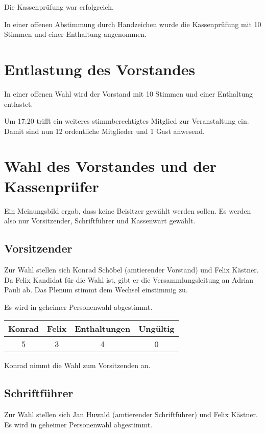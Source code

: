 \documentclass{scrartcl}
\begin{document}
Die Kassenprüfung war erfolgreich.

In einer offenen Abstimmung durch Handzeichen wurde die Kassenprüfung
mit 10 Stimmen und einer Enthaltung angenommen.

\section{Entlastung des Vorstandes}
In einer offenen Wahl wird der Vorstand mit 10 Stimmen und einer
Enthaltung entlastet.

Um 17:20 trifft ein weiteres stimmberechtigtes Mitglied zur
Veranstaltung ein. Damit sind nun 12 ordentliche Mitglieder und 1 Gast
anwesend.

\section{Wahl des Vorstandes und der Kassenprüfer}

Ein Meinungsbild ergab, dass keine Beisitzer gewählt werden sollen. Es
werden also nur Vorsitzender, Schriftführer und Kassenwart gewählt.

\subsection{Vorsitzender}
Zur Wahl stellen sich Konrad Schöbel (amtierender Vorstand) und Felix
Kästner. Da Felix Kandidat für die Wahl ist, gibt er die
Versammlungsleitung an Adrian Pauli ab. Das Plenum stimmt dem Wechsel
einstimmig zu.

Es wird in geheimer Personenwahl abgestimmt.

\begin{table}[h!]
    \centering
    \begin{tabular}{c|c|c|c}
        \textbf{Konrad} & \textbf{Felix} & \textbf{Enthaltungen} &
\textbf{Ungültig} \\ \hline
        5 & 3 & 4 & 0 \\
    \end{tabular}
\end{table}

Konrad nimmt die Wahl zum Vorsitzenden an.

\subsection{Schriftführer}
Zur Wahl stellen sich Jan Huwald (amtierender Schriftführer) und Felix
Kästner. Es wird in geheimer Personenwahl abgestimmt.
\end{document}
